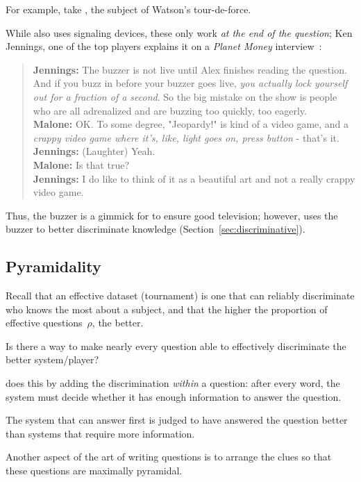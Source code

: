 For example, take \jeopardy{}, the subject of Watson's tour-de-force.  

While \jeopardy{} also uses signaling devices, these only work \emph{at the end of the question}; Ken Jennings, one of the top \jeopardy{} players explains it on a \textit{Planet Money} interview~\cite{malone-19}:
\begin{quote}
{\bf Jennings:} The buzzer is
    not live until Alex finishes reading the question. And if you buzz
    in before your buzzer goes live, \emph{you actually lock yourself out
    for a fraction of a second}. So the big mistake on the show is
    people who are all adrenalized and are buzzing too quickly, too
    eagerly. \\
{\bf Malone:} OK. To some degree, "Jeopardy!" is kind of a video game, and a \emph{crappy video game where it's, like, light goes on, press button} - that's it. \\
{\bf Jennings:} (Laughter) Yeah. \\
{\bf Malone:} Is that true? \\
{\bf Jennings:} I do like to think of it as a beautiful art and not a really crappy video game.
\end{quote}

Thus, the buzzer is a gimmick for \jeopardy{} to ensure good television; however, \qb{} uses the buzzer to better discriminate knowledge (Section~\ref{sec:discriminative}).

\subsection{Pyramidality}
\label{sec:pyramidality}

Recall that an effective dataset (tournament) is one that can reliably discriminate who knows the most about a subject, and that the higher the proportion of effective questions~$\rho$, the better.

Is there a way to make nearly every question able to effectively discriminate the better system/player?

\qb{} does this by adding the discrimination \emph{within} a question: after every word, the system must decide whether it has enough information to answer the question.

The system that can answer first is judged to have answered the question better than systems that require more information.

Another aspect of the art of writing \qb{} questions is to arrange the clues so that these questions are maximally pyramidal.

